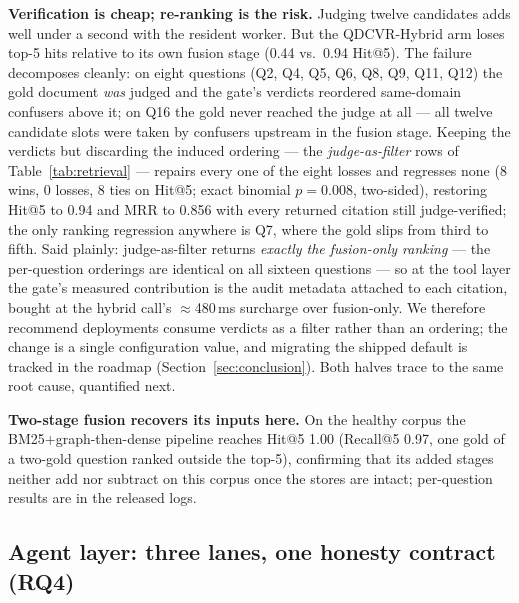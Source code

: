 \textbf{Verification is cheap; re-ranking is the risk.} Judging twelve
candidates adds well under a second with the resident worker. But the
QDCVR-Hybrid arm loses top-5 hits relative to its own fusion stage
(0.44 vs.\ 0.94 Hit@5). The failure decomposes cleanly: on eight questions
(Q2, Q4, Q5, Q6, Q8, Q9, Q11, Q12) the gold document \emph{was} judged and
the gate's verdicts reordered same-domain confusers above it; on Q16 the
gold never reached the judge at all --- all twelve candidate slots were
taken by confusers upstream in the fusion stage. Keeping the verdicts but
discarding the induced ordering --- the \emph{judge-as-filter} rows of
Table~\ref{tab:retrieval} --- repairs every one of the eight losses and
regresses none (8 wins, 0 losses, 8 ties on Hit@5; exact binomial
$p = 0.008$, two-sided), restoring Hit@5 to 0.94 and MRR to 0.856 with
every returned citation still judge-verified; the only ranking regression
anywhere is Q7, where the gold slips from third to fifth. Said plainly:
judge-as-filter returns \emph{exactly the fusion-only ranking} --- the
per-question orderings are identical on all sixteen questions --- so at
the tool layer the gate's measured contribution is the audit metadata
attached to each citation, bought at the hybrid call's $\approx$480\,ms
surcharge over fusion-only. We therefore recommend deployments consume
verdicts as a filter rather than an ordering; the change is a single
configuration value, and migrating the shipped default is tracked in the
roadmap (Section~\ref{sec:conclusion}). Both halves
trace to the same root cause, quantified next.

\textbf{Two-stage fusion recovers its inputs here.} On the healthy corpus
the BM25+graph-then-dense pipeline reaches Hit@5 1.00 (Recall@5 0.97, one gold of a two-gold question ranked
outside the top-5), confirming that its added stages
 neither add nor subtract on this corpus once the stores are intact;
per-question results are in the released logs.

\subsection{Agent layer: three lanes, one honesty contract (RQ4)}
\label{sec:agentic}

\begin{table}[!htbp]
\centering
\small
\caption{Agentic end-to-end runs, round 1: four questions $\times$ four
arms through the public chat API (engine \texttt{omp} over GLM-5.3-Flash,
20-turn budget; the full grid is run twice, see text). ``Cite'' = the
answer names the gold document;
``Facts'' = ground-truth fact markers contained / available. The bare
arm's sporadic marker matches are coincidental: it cites no source, and
its answers typically disclaim figures as unverified parametric recall.}
\label{tab:agentic}

\end{table}


